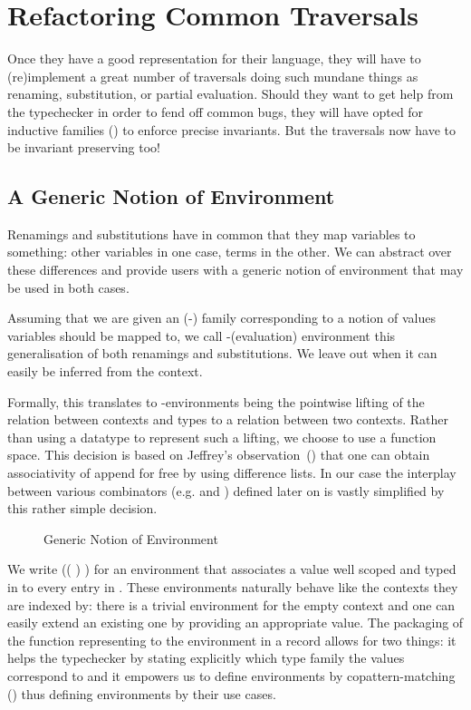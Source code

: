 \chapter{Refactoring Common Traversals}

Once they have a good representation for their language, they will have to
(re)implement a great number of traversals doing such mundane things as
renaming, substitution, or partial evaluation. Should they want to get help
from the typechecker in order to fend off common bugs, they will have opted
for inductive families (\cite{dybjer1991inductive}) to enforce precise
invariants. But the traversals now have to be invariant preserving too!

\section{A Generic Notion of Environment}
\label{sec:genenvironment}

Renamings and substitutions have in common that they map variables
to something: other variables in one case, terms in the other. We
can abstract over these differences and provide users with a generic
notion of environment that may be used in both cases.

Assuming that we are given an (-) family 
corresponding to a notion of values variables should be mapped to,
we call -(evaluation) environment this generalisation of both
renamings and substitutions. We leave out  when it can easily
be inferred from the context.

Formally, this translates to -environments being the pointwise
lifting of the relation  between contexts and types to a relation
between two contexts. Rather than using a datatype to represent such a
lifting, we choose to use a function space.
%
This decision is based on Jeffrey's observation~(\citeyear{jeffrey2011assoc})
that one can obtain associativity of append for free by using difference lists.
In our case the interplay between various combinators (e.g.  and
) defined later on is vastly simplified by this rather simple
decision.

\begin{figure}[h]
\caption{Generic Notion of Environment\label{fig:env}}
\end{figure}

We write {(( )  )} for an environment that
associates a value  well scoped and typed in  to every
entry in .
%
These environments naturally behave like the contexts they are indexed by:
there is a trivial environment for the empty context and one can easily
extend an existing one by providing an appropriate value. The packaging of
the function representing to the environment in a record allows for two
things: it helps the typechecker by stating explicitly which type family
the values correspond to and it empowers us to define environments by
copattern-matching (\cite{abel2013copatterns}) thus defining environments
by their use cases.

